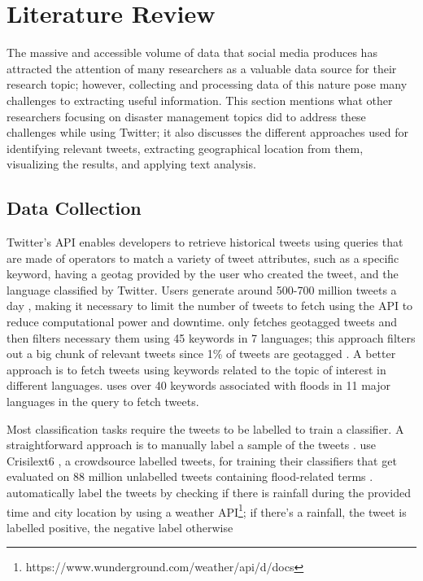 \section{Literature Review}

The massive and accessible volume of data that social media produces has attracted the attention of
many researchers as a valuable data source for their research topic; however, collecting and
processing data of this nature pose many challenges to extracting useful information. This section
mentions what other researchers focusing on disaster management topics did to address these
challenges while using Twitter; it also discusses the different approaches used for identifying
relevant tweets, extracting geographical location from them, visualizing the results, and applying
text analysis.

\subsection{Data Collection} Twitter's \ac{API} enables developers to retrieve historical tweets using
queries that are made of operators to match a variety of tweet attributes, such as a specific
keyword, having a geotag provided by the user who created the tweet, and the language classified by
Twitter. Users generate around 500-700 million tweets a day \cite{inproceedings}, making it
necessary to limit the number of tweets to fetch using the \ac{API} to reduce computational power and
downtime.  only fetches geotagged tweets and then filters
necessary
them using 45 keywords in 7 languages; this approach filters out a big chunk of relevant tweets
since 1\% of tweets are geotagged \cite{middletonRealTimeCrisisMapping2014}. A better approach is to
fetch tweets using keywords related to the topic of interest in different languages.
 uses over 40 keywords associated with floods in 11
major languages in the query to fetch tweets.

Most classification tasks require the tweets to be labelled to train a classifier. A straightforward
approach is to manually label a sample of the tweets
\cite{debruijnGlobalDatabaseHistoric2019b}\cite{barkerDevelopmentNationalscaleRealtime2019}.
 use Crisilext6
\cite{olteanuCrisisLexLexiconCollecting2014}, a crowdsource labelled tweets, for training their
classifiers that get evaluated on 88 million unlabelled tweets containing flood-related terms
\cite{DVN/T3ZFMR_2019}.  automatically label the tweets
by checking if there is rainfall during the provided time and city location by using a weather
\ac{API}\footnote{https://www.wunderground.com/weather/api/d/docs}; if there's a rainfall, the tweet is
labelled positive, the negative label otherwise

